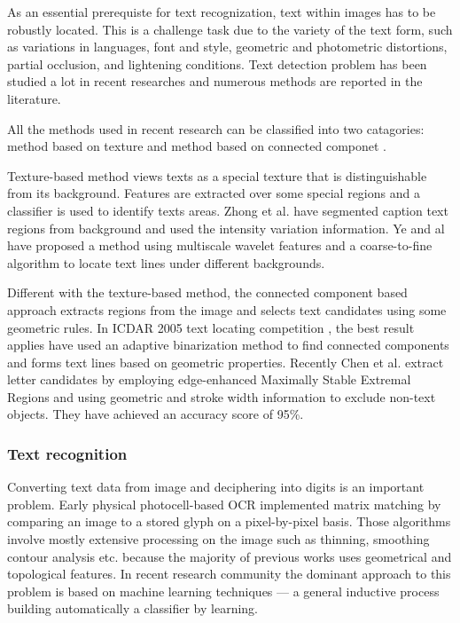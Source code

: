 \documentclass[paper=a4, french, 11pt]{scrartcl}
\begin{document}
As an essential prerequiste for text recognization, text within images has to be robustly located. This is a challenge task due to the variety of the text form, such as variations in languages, font and style, geometric and photometric distortions, partial occlusion, and lightening conditions. Text detection problem has been studied a lot in recent researches and numerous methods are reported in the literature.

All the methods used in recent research can be classified into two catagories: method based on texture \cite{ye2003robust} \cite{kim2003texture} and method based on connected componet \cite{yin2014robust} \cite{ezaki2004text}.

Texture-based method views texts as a special texture that is distinguishable from its background. Features are extracted over some special regions and a classifier is used to identify texts areas. Zhong et al. \cite{zhong2000automatic} have segmented caption text regions from background and used the intensity variation information. Ye and al \cite{ye2003robust} have proposed a method using multiscale wavelet features and a coarse-to-fine algorithm to locate text lines under different backgrounds.

Different with the texture-based method, the connected component based approach extracts regions from the image and selects text candidates using some geometric rules. In ICDAR 2005 text locating competition \cite{lucas2005icdar}, the best result applies have used an adaptive binarization method to find connected components and forms text lines based on geometric properties. Recently Chen et al. \cite{chen2011robust} extract letter candidates by employing edge-enhanced Maximally Stable Extremal Regions and using geometric and stroke width information to exclude non-text objects. They have achieved an accuracy score of 95\%.

\subsubsection{Text recognition} \mbox{} \vspace{-0.5cm}

Converting text data from image and deciphering into digits is an important problem. Early physical photocell-based OCR implemented matrix matching by comparing an image to a stored glyph on a pixel-by-pixel basis. Those algorithms involve mostly extensive processing on the image such as thinning, smoothing contour analysis etc. because the majority of previous works uses geometrical and topological features. In recent research community the dominant approach to this problem is based on machine learning techniques --- a general inductive process building automatically a classifier by learning.
\end{document}
